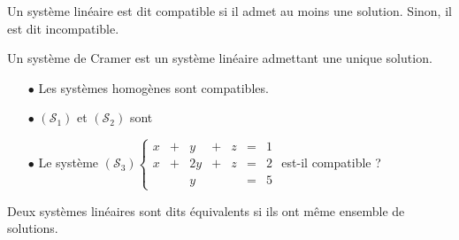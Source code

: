 \documentclass[a4paper, 11pt]{article}
\begin{document}
\vspace{0.4cm}

{\noindent  

\begin{defi} 
Un syst\`eme lin\'eaire est dit compatible si il admet au moins une solution.
\noindent Sinon, il est dit incompatible.
\end{defi}

}
\begin{defi} 
Un syst\`eme de Cramer est un syst\`eme lin\'eaire admettant une unique solution. 
\end{defi}


\begin{exemples} 
\begin{itemize}
\item[$\bullet$] Les systèmes homogènes sont compatibles. 
\item[$\bullet$] $(\mathcal{S}_1)$ et $(\mathcal{S}_2)$ sont \dotfill
\item[$\bullet$] Le syst\`{e}me $(\mathcal{S}_3)\left\lbrace\begin{array}{rcrcrcr}
x & + & y & + & z &= & 1\\
x & + &  2y  &+ & z & = &2\\
  &   &     y &   &  & = &5
\end{array}\right.$ est-il compatible ?
\dotfill
\end{itemize}
\end{exemples}


\vspace{0.4cm}


\vspace{0.4cm}

{\noindent  

\begin{defi} 
Deux syst\`emes lin\'eaires sont dits \'equivalents  si ils ont même ensemble de solutions. 
\end{defi}

}
\end{document}
